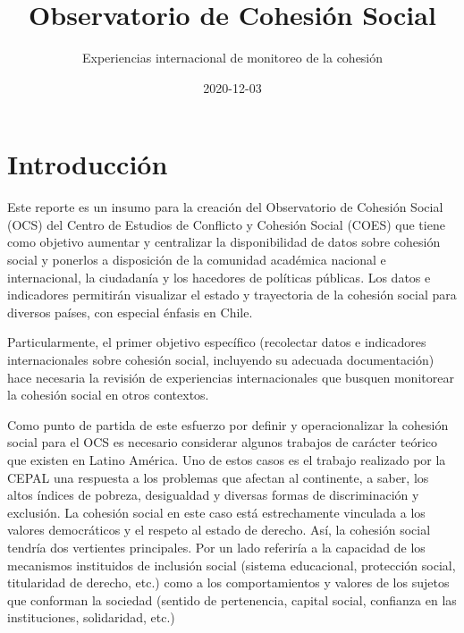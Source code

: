\documentclass[
  12pt,
]{book}
\title{Observatorio de Cohesión Social}
\subtitle{Experiencias internacional de monitoreo de la cohesión}
\author{}
\date{\vspace{-2.5em}2020-12-03}
\begin{document}
\maketitle

	

{
\setcounter{tocdepth}{1}
\tableofcontents
}
\listoftables
\listoffigures
{}
\hypertarget{introducciuxf3n}{%
\chapter{Introducción}\label{introducciuxf3n}}

Este reporte es un insumo para la creación del Observatorio de Cohesión
Social (OCS) del Centro de Estudios de Conflicto y Cohesión Social
(COES) que tiene como objetivo aumentar y centralizar la disponibilidad
de datos sobre cohesión social y ponerlos a disposición de la comunidad
académica nacional e internacional, la ciudadanía y los hacedores de
políticas públicas. Los datos e indicadores permitirán visualizar el
estado y trayectoria de la cohesión social para diversos países, con
especial énfasis en Chile.

Particularmente, el primer objetivo específico (recolectar datos e
indicadores internacionales sobre cohesión social, incluyendo su
adecuada documentación) hace necesaria la revisión de experiencias
internacionales que busquen monitorear la cohesión social en otros
contextos.

Como punto de partida de este esfuerzo por definir y operacionalizar la
cohesión social para el OCS es necesario considerar algunos trabajos de
carácter teórico que existen en Latino América. Uno de estos casos es el
trabajo realizado por la CEPAL \citep{ottone2007cohesion} una respuesta a los
problemas que afectan al continente, a saber, los altos índices de
pobreza, desigualdad y diversas formas de discriminación y exclusión. La
cohesión social en este caso está estrechamente vinculada a los valores
democráticos y el respeto al estado de derecho. Así, la cohesión social
tendría dos vertientes principales. Por un lado referiría a la capacidad
de los mecanismos instituidos de inclusión social (sistema educacional,
protección social, titularidad de derecho, etc.) como a los
comportamientos y valores de los sujetos que conforman la sociedad
(sentido de pertenencia, capital social, confianza en las instituciones,
solidaridad, etc.)
\end{document}
